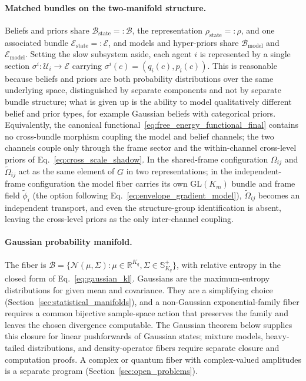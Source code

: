 \paragraph{Matched bundles on the two-manifold structure.}
Beliefs and priors share $\mathcal{B}_{\mathrm{state}} =: \mathcal{B}$, the representation $\rho_{\mathrm{state}} =: \rho$, and one associated bundle $\mathcal{E}_{\mathrm{state}} =: \mathcal{E}$, and models and hyper-priors share $\mathcal{B}_{\mathrm{model}}$ and $\mathcal{E}_{\mathrm{model}}$. Setting the slow subsystem aside, each agent $i$ is represented by a single section $\sigma^i: \mathcal{U}_i \to \mathcal{E}$ carrying $\sigma^i(c) = (q_i(c), p_i(c))$. This is reasonable because beliefs and priors are both probability distributions over the same underlying space, distinguished by separate components and not by separate bundle structure; what is given up is the ability to model qualitatively different belief and prior types, for example Gaussian beliefs with categorical priors. Equivalently, the canonical functional~\eqref{eq:free_energy_functional_final} contains no cross-bundle morphism coupling the model and belief channels; the two channels couple only through the frame sector and the within-channel cross-level priors of Eq.~\eqref{eq:cross_scale_shadow}. In the shared-frame configuration $\Omega_{ij}$ and $\tilde{\Omega}_{ij}$ act as the same element of $G$ in two representations; in the independent-frame configuration the model fiber carries its own $\mathrm{GL}(K_m)$ bundle and frame field $\tilde{\phi}_i$ (the option following Eq.~\eqref{eq:envelope_gradient_model}), $\tilde{\Omega}_{ij}$ becomes an independent transport, and even the structure-group identification is absent, leaving the cross-level priors as the only inter-channel coupling.

\paragraph{Gaussian probability manifold.}
The fiber is $\mathcal{B} = \{\mathcal{N}(\mu, \Sigma) : \mu \in \mathbb{R}^{K_q}, \Sigma \in \mathbb{S}^+_{K_q}\}$, with relative entropy in the closed form of Eq.~\eqref{eq:gaussian_kl}. Gaussians are the maximum-entropy distributions for given mean and covariance. They are a simplifying choice (Section~\ref{sec:statistical_manifolds}), and a non-Gaussian exponential-family fiber requires a common bijective sample-space action that preserves the family and leaves the chosen divergence computable. The Gaussian theorem below supplies this closure for linear pushforwards of Gaussian states; mixture models, heavy-tailed distributions, and density-operator fibers require separate closure and computation proofs. A complex or quantum fiber with complex-valued amplitudes is a separate program (Section~\ref{sec:open_problems}).


